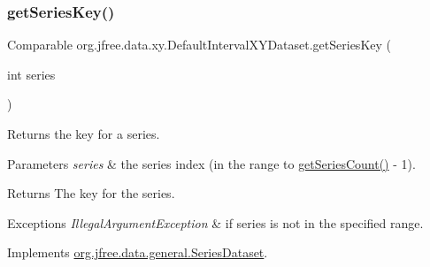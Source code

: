 \mbox{\label{classorg_1_1jfree_1_1data_1_1xy_1_1_default_interval_x_y_dataset_a723e63b81200f1f06ffee4defe23dee9}} 
\subsubsection{\texorpdfstring{get\+Series\+Key()}{getSeriesKey()}}
{\footnotesize\ttfamily Comparable org.\+jfree.\+data.\+xy.\+Default\+Interval\+X\+Y\+Dataset.\+get\+Series\+Key (\begin{DoxyParamCaption}\item[{int}]{series }\end{DoxyParamCaption})}

Returns the key for a series.


\begin{DoxyParams}{Parameters}
{\em series} & the series index (in the range {} to {\ttfamily \mbox{\hyperlink{classorg_1_1jfree_1_1data_1_1xy_1_1_default_interval_x_y_dataset_a11470bfa9b540c971123d4282c0f5a8a}{get\+Series\+Count()}} -\/ 1}).\\
\hline
\end{DoxyParams}
\begin{DoxyReturn}{Returns}
The key for the series.
\end{DoxyReturn}

\begin{DoxyExceptions}{Exceptions}
{\em Illegal\+Argument\+Exception} & if {\ttfamily series} is not in the specified range. \\
\hline
\end{DoxyExceptions}


Implements \mbox{\hyperlink{interfaceorg_1_1jfree_1_1data_1_1general_1_1_series_dataset_a60488892b2314a05a012999e26a74178}{org.\+jfree.\+data.\+general.\+Series\+Dataset}}.

\mbox{\label{classorg_1_1jfree_1_1data_1_1xy_1_1_default_interval_x_y_dataset_af1221379a4ac6d470d0b901b80841940}} 
